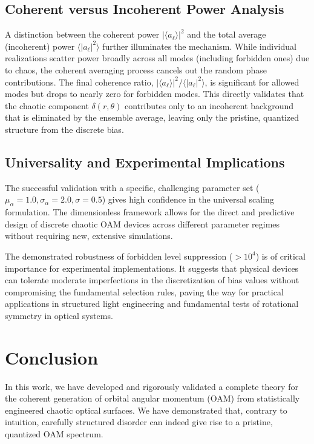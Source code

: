 \documentclass[a4paper,12pt]{article}
\begin{document}
\subsection{Coherent versus Incoherent Power Analysis}

A distinction between the coherent power $|\langle a_\ell \rangle|^2$ and the total average (incoherent) 
power $\langle |a_\ell|^2 \rangle$ further illuminates the mechanism. While individual realizations scatter 
power broadly across all modes (including forbidden ones) due to chaos, the coherent averaging process cancels 
out the random phase contributions. The final coherence ratio, 
$|\langle a_\ell \rangle|^2 / \langle |a_\ell|^2 \rangle$, is significant for allowed modes but drops to nearly 
zero for forbidden modes. This directly validates that the chaotic component $\delta(r, \theta)$ contributes only 
to an incoherent background that is eliminated by the ensemble average, leaving only the pristine, quantized 
structure from the discrete bias.

\subsection{Universality and Experimental Implications}

The successful validation with a specific, challenging parameter set 
($\mu_\alpha=1.0, \sigma_\alpha=2.0, \sigma=0.5$) gives high confidence in the universal scaling formulation. 
The dimensionless framework allows for the direct and predictive design of discrete chaotic OAM devices across 
different parameter regimes without requiring new, extensive simulations.

The demonstrated robustness of forbidden level suppression ($>10^4$) is of critical importance for experimental 
implementations. It suggests that physical devices can tolerate moderate imperfections in the discretization of 
bias values without compromising the fundamental selection rules, paving the way for practical applications in 
structured light engineering and fundamental tests of rotational symmetry in optical systems.


\section{Conclusion}

In this work, we have developed and rigorously validated a complete theory for the coherent generation of orbital 
angular momentum (OAM) from statistically engineered chaotic optical surfaces. We have demonstrated that, contrary 
to intuition, carefully structured disorder can indeed give rise to a pristine, quantized OAM spectrum.
\end{document}
